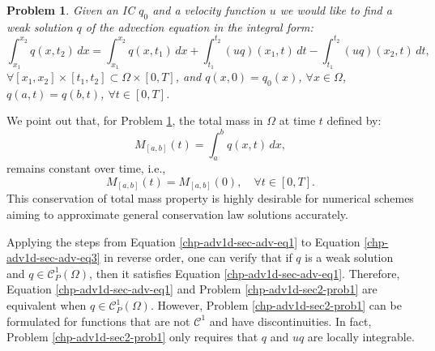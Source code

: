 \theoremstyle{plain}
\newtheorem{prob}{Problem}[chapter]
\begin{prob}
	\label{chp-adv1d-sec2-prob1}
	Given an IC ${q}_0$ and a velocity function $u$  we would like to find a weak solution ${q}$
	of the advection equation in the integral form:
	\begin{equation*}
	        \int_{x_1}^{x_2} {q}(x, t_2) \,dx =
       		\int_{x_1}^{x_2} {q}(x, t_1) \,dx +
        	\int_{t_1}^{t_2} {(uq)}(x_1, t) \,dt -
		\int_{t_1}^{t_2}{(uq)}(x_2, t) \,dt ,
	\end{equation*}
	$\forall [x_1, x_2]\times[t_1, t_2] \subset \Omega \times [0,T]$,
	and
	${q}(x,0) = {q}_0(x)$, $\forall x \in \Omega$, $q(a,t)=q(b,t)$, $\forall t \in [0,T]$.
\end{prob}
We point out that, for Problem \ref{chp-adv1d-sec2-prob1}, the total mass in $\Omega$ at time $t$ defined by:
\begin{equation*}
{M}_{[a,b]}(t) = \int_{a}^{b} q(x,t) \,dx,
\end{equation*}
remains constant over time, i.e.,
\begin{equation*}
	{M}_{[a,b]}(t) = {M}_{[a,b]}(0), \quad \forall t \in [0,T].
\end{equation*}
This conservation of total mass property is highly desirable for numerical schemes aiming
to approximate general conservation law solutions accurately.

Applying the steps from Equation \eqref{chp-adv1d-sec-adv-eq1} to Equation \eqref{chp-adv1d-sec-adv-eq3} in reverse order,
one can verify that if ${q}$ is a weak solution and $q \in \mathcal{C}^1_P{(\Omega)}$, then it satisfies Equation \eqref{chp-adv1d-sec-adv-eq1}.
Therefore, Equation \eqref{chp-adv1d-sec-adv-eq1} and Problem \eqref{chp-adv1d-sec2-prob1} are equivalent when $q \in \mathcal{C}^1_P{(\Omega)}$.
However, Problem \eqref{chp-adv1d-sec2-prob1} can be formulated for functions that are not $\mathcal{C}^1$ and have discontinuities.
In fact, Problem \eqref{chp-adv1d-sec2-prob1} only requires that $q$ and $uq$ are locally integrable.

